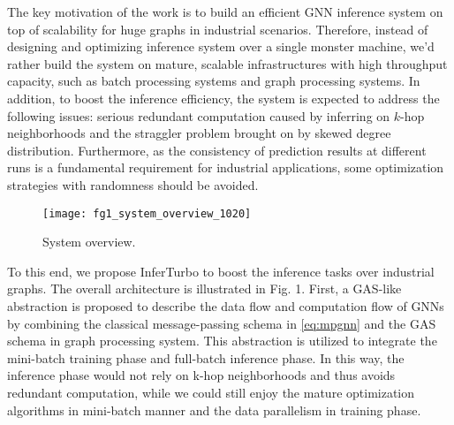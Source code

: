 \documentclass[conference]{IEEEtran}
\begin{document}
The key motivation of the work is to build an efficient GNN inference system on top of scalability for huge graphs in industrial scenarios.
Therefore, instead of designing and optimizing inference system over a single monster machine, we'd rather build the system on mature, scalable infrastructures with high throughput capacity, such as batch processing systems and graph processing systems. 
In addition, to boost the inference efficiency, the system is expected to address the following issues: 
serious redundant computation caused by inferring on $k$-hop neighborhoods and the straggler problem brought on by skewed degree distribution.
Furthermore, as the consistency of prediction results at different runs is a fundamental requirement for industrial applications, some optimization strategies with randomness should be avoided.


\begin{figure}[htbp]
\centering
\texttt{[image: fg1\_system\_overview\_1020]}
\caption{System overview.}
\label{fig:system_overview}
\end{figure}


To this end, we propose InferTurbo to boost the inference tasks over industrial graphs.
The overall architecture is illustrated in Fig. 1.
First, a GAS-like abstraction is proposed to describe the data flow and computation flow of GNNs by combining the classical message-passing schema in \eqref{eq:mpgnn} and the GAS schema in graph processing system.
This abstraction is utilized to integrate the mini-batch training phase and full-batch inference phase.
In this way, the inference phase would not rely on k-hop neighborhoods and thus avoids redundant computation, while we could still enjoy the mature optimization algorithms in mini-batch manner and the data parallelism in training phase.
\end{document}

